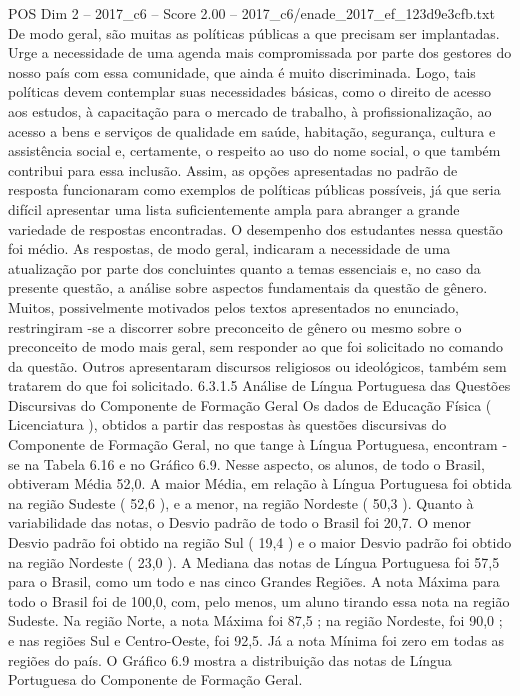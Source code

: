 \begin{textsample}{POS Dim 2 – 2017\_c6 – Score 2.00 – 2017\_c6/enade\_2017\_ef\_123d9e3cfb.txt}
De modo geral, são muitas as políticas públicas a que precisam ser implantadas.
Urge a necessidade de uma agenda mais compromissada por parte dos gestores do nosso país com essa comunidade, que ainda é muito discriminada.
Logo, tais políticas devem contemplar suas necessidades básicas, como o direito de acesso aos estudos, à capacitação para o mercado de trabalho, à profissionalização, ao acesso a bens e serviços de qualidade em saúde, habitação, segurança, cultura e assistência social e, certamente, o respeito ao uso do nome social, o que também contribui para essa inclusão.
Assim, as opções apresentadas no padrão de resposta funcionaram como exemplos de políticas públicas possíveis, já que seria difícil apresentar uma lista suficientemente ampla para abranger a grande variedade de respostas encontradas.
O desempenho dos estudantes nessa questão foi médio.
As respostas, de modo geral, indicaram a necessidade de uma atualização por parte dos concluintes quanto a temas essenciais e, no caso da presente questão, a análise sobre aspectos fundamentais da questão de gênero.
Muitos, possivelmente motivados pelos textos apresentados no enunciado, restringiram -se a discorrer sobre preconceito de gênero ou mesmo sobre o preconceito de modo mais geral, sem responder ao que foi solicitado no comando da questão.
Outros apresentaram discursos religiosos ou ideológicos, também sem tratarem do que foi solicitado. 6.3.1.5 Análise de Língua Portuguesa das Questões Discursivas do Componente de Formação Geral Os dados de Educação Física ( Licenciatura ), obtidos a partir das respostas às questões discursivas do Componente de Formação Geral, no que tange à Língua Portuguesa, encontram -se na Tabela 6.16 e no Gráfico 6.9.
Nesse aspecto, os alunos, de todo o Brasil, obtiveram Média 52,0.
A maior Média, em relação à Língua Portuguesa foi obtida na região Sudeste ( 52,6 ), e a menor, na região Nordeste ( 50,3 ).
Quanto à variabilidade das notas, o Desvio padrão de todo o Brasil foi 20,7.
O menor Desvio padrão foi obtido na região Sul ( 19,4 ) e o maior Desvio padrão foi obtido na região Nordeste ( 23,0 ).
A Mediana das notas de Língua Portuguesa foi 57,5 para o Brasil, como um todo e nas cinco Grandes Regiões.
A nota Máxima para todo o Brasil foi de 100,0, com, pelo menos, um aluno tirando essa nota na região Sudeste.
Na região Norte, a nota Máxima foi 87,5 ; na região Nordeste, foi 90,0 ; e nas regiões Sul e Centro-Oeste, foi 92,5.
Já a nota Mínima foi zero em todas as regiões do país.
O Gráfico 6.9 mostra a distribuição das notas de Língua Portuguesa do Componente de Formação Geral.

\end{textsample}

